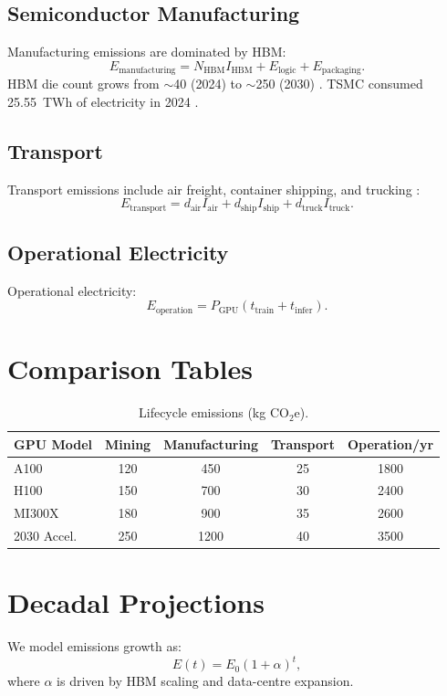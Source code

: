 \documentclass[12pt]{article}
\begin{document}
\subsection{Semiconductor Manufacturing}
Manufacturing emissions are dominated by HBM:
\[
E_{\text{manufacturing}} = N_{\text{HBM}} I_{\text{HBM}} + 
E_{\text{logic}} + E_{\text{packaging}}.
\]
HBM die count grows from $\sim$40 (2024) to $\sim$250 (2030) \cite{techinsights2025}.  
TSMC consumed 25.55~TWh of electricity in 2024 \cite{tsmc2024}.

\subsection{Transport}
Transport emissions include air freight, container shipping, and trucking \cite{cpai2024}:
\[
E_{\text{transport}} = d_{\text{air}} I_{\text{air}} + d_{\text{ship}} I_{\text{ship}} + d_{\text{truck}} I_{\text{truck}}.
\]

\subsection{Operational Electricity}
Operational electricity:
\[
E_{\text{operation}} = P_{\text{GPU}} (t_{\text{train}} + t_{\text{infer}}).
\]

\section{Comparison Tables}

\begin{table}[h]
\centering
\begin{tabular}{lcccc}
\toprule
GPU Model & Mining & Manufacturing & Transport & Operation/yr \\
\midrule
A100 & 120 & 450 & 25 & 1800 \\
H100 & 150 & 700 & 30 & 2400 \\
MI300X & 180 & 900 & 35 & 2600 \\
2030 Accel. & 250 & 1200 & 40 & 3500 \\
\bottomrule
\end{tabular}
\caption{Lifecycle emissions (kg CO$_2$e).}
\end{table}

\section{Decadal Projections}
We model emissions growth as:
\[
E(t) = E_0 (1 + \alpha)^t,
\]
where $\alpha$ is driven by HBM scaling and data-centre expansion.
\end{document}
